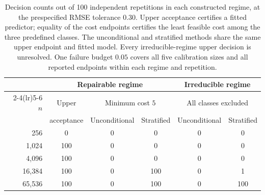 \begin{table}[t]
\centering
\small
\begin{tabular}{rccccc}
\toprule
 & \multicolumn{3}{c}{Repairable regime} & \multicolumn{2}{c}{Irreducible regime} \\
\cmidrule(lr){2-4}\cmidrule(lr){5-6}
$n$ & Upper & \multicolumn{2}{c}{Minimum cost $5$} & \multicolumn{2}{c}{All classes excluded} \\
 & acceptance & Unconditional & Stratified & Unconditional & Stratified \\
\midrule
256 & 0 & 0 & 0 & 0 & 0 \\
1,024 & 100 & 0 & 0 & 0 & 0 \\
4,096 & 100 & 0 & 0 & 0 & 0 \\
16,384 & 100 & 0 & 100 & 0 & 1 \\
65,536 & 100 & 0 & 100 & 0 & 100 \\
\bottomrule
\end{tabular}
\caption{Decision counts out of 100 independent repetitions in each constructed regime, at the prespecified RMSE tolerance $0.30$. Upper acceptance certifies a fitted predictor; equality of the cost endpoints certifies the least feasible cost among the three predefined classes. The unconditional and stratified methods share the same upper endpoint and fitted model. Every irreducible-regime upper decision is unresolved. One failure budget $0.05$ covers all five calibration sizes and all reported endpoints within each regime and repetition.}
\label{tab:decision-outcomes}
\end{table}
